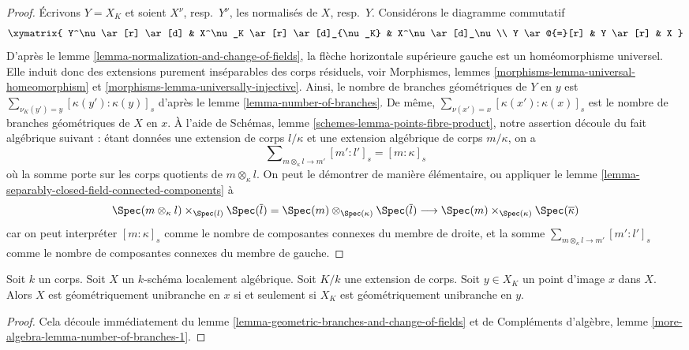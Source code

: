 \begin{proof}
Écrivons $Y = X_K$ et soient $X^\nu$, resp.\ $Y^\nu$, les normalisés
de $X$, resp.\ $Y$. Considérons le diagramme commutatif
$$
\xymatrix{
Y^\nu \ar[r] \ar[d] & X^\nu_K \ar[r] \ar[d]_{\nu_K} & X^\nu \ar[d]_\nu \\
Y \ar@{=}[r] & Y \ar[r] & X
}
$$
D'après le lemme \ref{lemma-normalization-and-change-of-fields},
la flèche horizontale supérieure gauche est un homéomorphisme universel.
Elle induit donc des extensions purement inséparables des corps résiduels, voir
Morphismes, lemmes \ref{morphisms-lemma-universal-homeomorphism} et
\ref{morphisms-lemma-universally-injective}.
Ainsi, le nombre de branches géométriques de $Y$ en $y$ est
$\sum_{\nu_K(y') = y} [\kappa(y') : \kappa(y)]_s$
d'après le lemme \ref{lemma-number-of-branches}. De même,
$\sum_{\nu(x') = x} [\kappa(x') : \kappa(x)]_s$ est le nombre de
branches géométriques de $X$ en $x$. À l'aide de Schémas, lemme
\ref{schemes-lemma-points-fibre-product},
notre assertion découle du fait algébrique suivant :
étant données une extension de corps $l/\kappa$ et
une extension algébrique de corps $m/\kappa$, on a
$$
\sum\nolimits_{m \otimes_\kappa l \to m'} [m' : l']_s = [m : \kappa]_s
$$
où la somme porte sur les corps quotients de $m \otimes_\kappa l$.
On peut le démontrer de manière élémentaire, ou appliquer
le lemme \ref{lemma-separably-closed-field-connected-components}
à
$$
\Spec(m \otimes_\kappa l) \times_{\Spec(l)} \Spec(\overline{l}) =
\Spec(m) \otimes_{\Spec(\kappa)} \Spec(\overline{l})
\longrightarrow
\Spec(m) \times_{\Spec(\kappa)} \Spec(\overline{\kappa})
$$
car on peut interpréter $[m : \kappa]_s$ comme le nombre de
composantes connexes du membre de droite, et la somme
$\sum_{m \otimes_\kappa l \to m'} [m' : l']_s$
comme le nombre de composantes connexes du membre de gauche.
\end{proof}

\begin{lemma}
\label{lemma-geometrically-unibranch-and-change-of-fields}
Soit $k$ un corps. Soit $X$ un $k$-schéma localement algébrique.
Soit $K/k$ une extension de corps. Soit $y \in X_K$ un
point d'image $x$ dans $X$. Alors $X$ est géométriquement unibranche
en $x$ si et seulement si $X_K$ est géométriquement unibranche en $y$.
\end{lemma}

\begin{proof}
Cela découle immédiatement du
lemme \ref{lemma-geometric-branches-and-change-of-fields}
et de Compléments d'algèbre, lemme \ref{more-algebra-lemma-number-of-branches-1}.
\end{proof}

